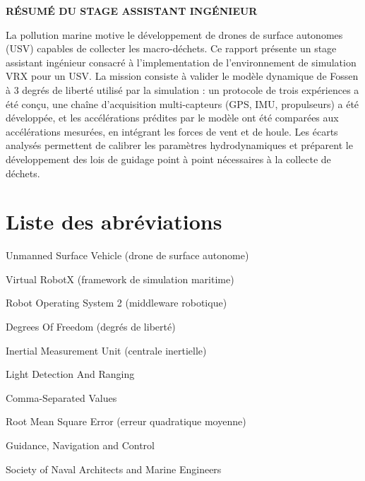 \documentclass{rapportEILCO}
\begin{document}
	\fairepagedegarde
	
	\thispagestyle{empty}
	\noindent\textbf{\large RÉSUMÉ DU STAGE ASSISTANT INGÉNIEUR}
	\vspace{0.5cm}
	

	La pollution marine motive le développement de drones de surface autonomes (USV) capables de collecter les macro-déchets. Ce rapport présente un stage assistant ingénieur consacré à l'implementation de l'environnement de simulation VRX pour un USV. La mission consiste à valider le modèle dynamique de Fossen à 3 degrés de liberté utilisé par la simulation : un protocole de trois expériences a été conçu, une chaîne d'acquisition multi-capteurs (GPS, IMU, propulseurs) a été développée, et les accélérations prédites par le modèle ont été comparées aux accélérations mesurées, en intégrant les forces de vent et de houle. Les écarts analysés permettent de calibrer les paramètres hydrodynamiques et préparent le développement des lois de guidage point à point nécessaires à la collecte de déchets.
	
	\newpage
	
	
	\section*{Liste des abréviations}
	\begin{description}[font=\normalfont\bfseries]
		\item[USV] Unmanned Surface Vehicle (drone de surface autonome)
		\item[VRX] Virtual RobotX (framework de simulation maritime)
		\item[ROS~2] Robot Operating System 2 (middleware robotique)
		\item[DOF] Degrees Of Freedom (degrés de liberté)
		\item[IMU] Inertial Measurement Unit (centrale inertielle)
		\item[LiDAR] Light Detection And Ranging
		\item[CSV] Comma-Separated Values
		\item[RMSE] Root Mean Square Error (erreur quadratique moyenne)
		\item[GNC] Guidance, Navigation and Control
		\item[SNAME] Society of Naval Architects and Marine Engineers
	\end{description}
	
\end{document}
